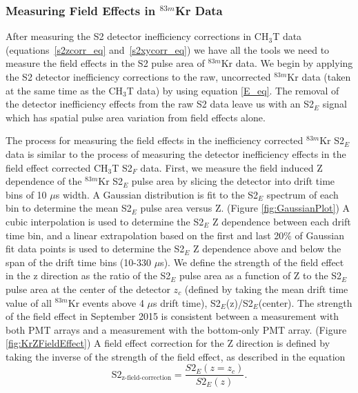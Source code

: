  
\subsubsection{Measuring Field Effects in $^{83m}$Kr Data} \label{section:FieldEffects}

After measuring the S2 detector inefficiency corrections in CH$_3$T data (equations~\ref{s2zcorr_eq} and~\ref{s2xycorr_eq}) we have all the tools we need to measure the field effects in the S2 pulse area of $^{83m}$Kr data.  We begin by applying the S2 detector inefficiency corrections to the raw,  uncorrected $^{83m}$Kr data (taken at the same time as the CH$_3$T data) by using equation \ref{E_eq}.  The removal of the detector inefficiency effects from the raw S2 data leave us with an S2$_E$ signal which has spatial pulse area variation from field effects alone.

The process for measuring the field effects in the inefficiency corrected $^{83m}$Kr S2$_E$ data is similar to the process of measuring the detector inefficiency effects in the field effect corrected CH$_3$T S2$_F$ data.  First, we measure the field induced Z dependence of the $^{83m}$Kr S2$_E$ pulse area by slicing the detector into drift time bins of 10 $\mu$s width.  A Gaussian distribution is fit to the S2$_E$ spectrum of each bin to determine the mean S2$_E$ pulse area versus Z. (Figure \ref{fig:GaussianPlot})  A cubic interpolation is used to determine the S2$_E$ Z dependence between each drift time bin, and a linear extrapolation based on the first and last 20\% of Gaussian fit data points is used to determine the S2$_E$ Z dependence above and below the span of the drift time bins (10-330 $\mu$s).  We define the strength of the field effect in the z direction as the ratio of the S2$_E$ pulse area as a function of Z to the S2$_E$ pulse area at the center of the detector $z_c$ (defined by taking the mean drift time value of all $^{83m}$Kr events above 4 $\mu$s drift time), S2$_E$(z)/S2$_E$(center). The strength of the field effect in September 2015 is consistent between a measurement with both PMT arrays and a measurement with the bottom-only PMT array. (Figure \ref{fig:KrZFieldEffect}) A field effect correction for the Z direction is defined by taking the inverse of the strength of the field effect, as described in the equation
\begin{equation}
\mbox{S}2_{\mbox{z-field-correction}} = \frac{S2_E(z=z_c)}{S2_E(z)}.
\end{equation} 



